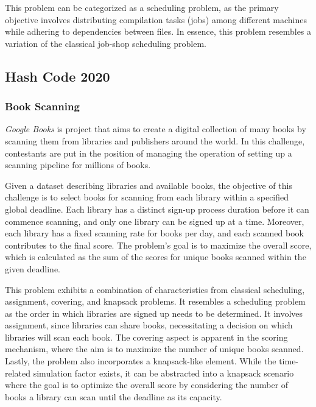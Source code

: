 This problem can be categorized as a scheduling problem, as the primary
objective involves distributing compilation tasks (jobs) among different
machines while adhering to dependencies between files. In essence, this problem
resembles a variation of the classical job-shop scheduling problem.

\subsection{Hash Code 2020}
\label{subsec:hashcode-2020}

\subsubsection*{Book Scanning}
\label{subsubsec:hashcode-2020-qualification}

\textit{Google Books} is project that aims to create a digital collection of many books
by scanning them from libraries and publishers around the world. In this
challenge, contestants are put in the position of managing the operation of
setting up a scanning pipeline for millions of books.

Given a dataset describing libraries and available books, the objective of this
challenge is to select books for scanning from each library within a specified
global deadline. Each library has a distinct sign-up process duration before it can
commence scanning, and only one library can be signed up at a time. Moreover,
each library has a fixed scanning rate for books per day, and each scanned book
contributes to the final score. The problem's goal is to maximize the overall
score, which is calculated as the sum of the scores for unique books scanned
within the given deadline.

This problem exhibits a combination of characteristics from classical
scheduling, assignment, covering, and knapsack problems. It resembles a
scheduling problem as the order in which libraries are signed up needs to be
determined. It involves assignment, since libraries can share books,
necessitating a decision on which libraries will scan each book. The covering
aspect is apparent in the scoring mechanism, where the aim is to maximize the
number of unique books scanned.  Lastly, the problem also incorporates a
knapsack-like element. While the time-related simulation factor exists, it can
be abstracted into a knapsack scenario where the goal is to optimize the overall
score by considering the number of books a library can scan until the deadline
as its capacity.

